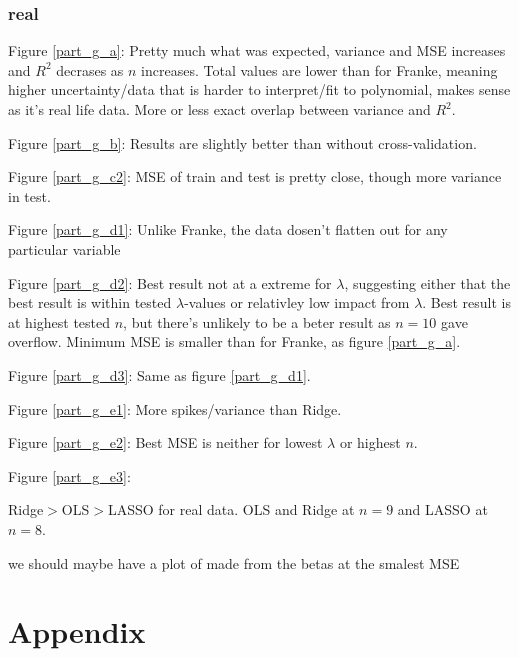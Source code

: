 \documentclass[a4paper,10pt,english]{article}
\begin{document}
\subsubsection{real}

Figure \ref{part_g_a}: Pretty much what was expected, variance and MSE increases and $R^2$ decrases as $n$ increases. Total values are lower than for Franke, meaning higher uncertainty/data that is harder to interpret/fit to polynomial, makes sense as it's real life data. More or less exact overlap between variance and $R^2$.

Figure \ref{part_g_b}: Results are slightly better than without cross-validation.

Figure \ref{part_g_c2}: MSE of train and test is pretty close, though more variance in test.

Figure \ref{part_g_d1}: Unlike Franke, the data dosen't flatten out for any particular variable

Figure \ref{part_g_d2}: Best result not at a extreme for $\lambda$, suggesting either that the best result is within tested $\lambda$-values or relativley low impact from $\lambda$. Best result is at highest tested $n$, but there's unlikely to be a beter result as $n=10$ gave overflow. Minimum MSE is smaller than for Franke, as figure \ref{part_g_a}. 

Figure \ref{part_g_d3}: Same as figure \ref{part_g_d1}.

Figure \ref{part_g_e1}: More spikes/variance than Ridge. 

Figure \ref{part_g_e2}: Best MSE is neither for lowest $\lambda$ or highest $n$.

Figure \ref{part_g_e3}: 


Ridge$>$OLS$>$LASSO for real data. OLS and Ridge at $n=9$ and LASSO at $n=8$.


we should maybe have a plot of made from the betas at the smalest MSE

\newpage

\section{Appendix}
\label{sec:appendix}

{}

\end{document}
